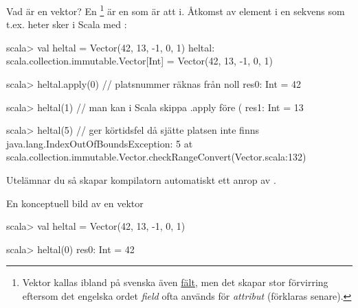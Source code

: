 \begin{Slide}{Vad är en vektor?}\SlideFontSmall
En \footnote{Vektor kallas ibland på svenska även \href{https://sv.wikipedia.org/wiki/F\%C3\%A4lt_\%28datastruktur\%29}{fält}, men det skapar stor förvirring eftersom det engelska ordet \emph{field} ofta används för \emph{attribut} (förklaras senare).}
 är en  som är  att  i.
Åtkomst av element i en sekvens som t.ex. heter  sker i Scala med :

\begin{REPL}
scala> val heltal = Vector(42, 13, -1, 0, 1)
heltal: scala.collection.immutable.Vector[Int] = Vector(42, 13, -1, 0, 1)

scala> heltal.apply(0)   // platsnummer räknas från noll
res0: Int = 42

scala> heltal(1)         // man kan i Scala skippa .apply före (
res1: Int = 13

scala> heltal(5)         // ger körtidsfel då sjätte platsen inte finns
java.lang.IndexOutOfBoundsException: 5
  at scala.collection.immutable.Vector.checkRangeConvert(Vector.scala:132)
\end{REPL}
Utelämnar du  så skapar kompilatorn automatiskt ett anrop av .
\end{Slide}

\begin{Slide}{En konceptuell bild av en vektor}

\begin{REPLnonum}
scala> val heltal = Vector(42, 13, -1, 0, 1)

scala> heltal(0)
res0: Int = 42
\end{REPLnonum}


\end{Slide}



